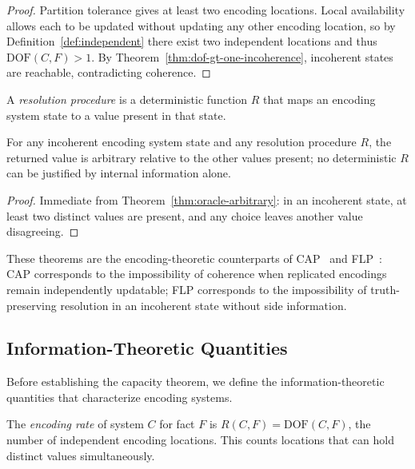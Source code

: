 \begin{proof}
Partition tolerance gives at least two encoding locations. Local availability allows each to be updated without updating any other encoding location, so by Definition~\ref{def:independent} there exist two independent locations and thus $\text{DOF}(C, F) > 1$. By Theorem~\ref{thm:dof-gt-one-incoherence}, incoherent states are reachable, contradicting coherence.
\end{proof}

\begin{definition}\label{def:resolution-procedure}
A \emph{resolution procedure} is a deterministic function $R$ that maps an encoding system state to a value present in that state.
\end{definition}

\begin{theorem}\label{thm:static-flp}
For any incoherent encoding system state and any resolution procedure $R$, the returned value is arbitrary relative to the other values present; no deterministic $R$ can be justified by internal information alone.
\end{theorem}

\begin{proof}
Immediate from Theorem~\ref{thm:oracle-arbitrary}: in an incoherent state, at least two distinct values are present, and any choice leaves another value disagreeing.
\end{proof}

These theorems are the encoding-theoretic counterparts of CAP~\cite{brewer2000cap,gilbert2002cap} and FLP~\cite{flp1985impossibility}: CAP corresponds to the impossibility of coherence when replicated encodings remain independently updatable; FLP corresponds to the impossibility of truth-preserving resolution in an incoherent state without side information.

\subsection{Information-Theoretic Quantities}\label{sec:it-quantities}

Before establishing the capacity theorem, we define the information-theoretic quantities that characterize encoding systems.

\begin{definition}\label{def:encoding-rate}
The \emph{encoding rate} of system $C$ for fact $F$ is $R(C, F) = \text{DOF}(C, F)$, the number of independent encoding locations. This counts locations that can hold distinct values simultaneously.
\end{definition}

